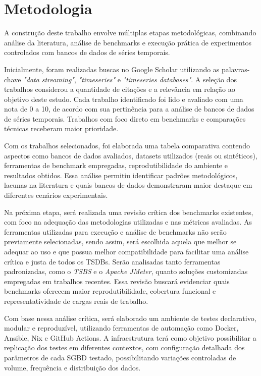 \chapter{Metodologia}

A construção deste trabalho envolve múltiplas etapas metodológicas, combinando análise da literatura, análise de benchmarks e execução prática de experimentos controlados com bancos de dados de séries temporais.

Inicialmente, foram realizadas buscas no Google Scholar utilizando as palavras-chave \textit{"data streaming"}, \textit{"timeseries"} e \textit{"timeseries databases"}. A seleção dos trabalhos considerou a quantidade de citações e a relevância em relação ao objetivo deste estudo. Cada trabalho identificado foi lido e avaliado com uma nota de 0 a 10, de acordo com sua pertinência para a análise de bancos de dados de séries temporais. Trabalhos com foco direto em benchmarks e comparações técnicas receberam maior prioridade.

Com os trabalhos selecionados, foi elaborada uma tabela comparativa contendo aspectos como bancos de dados avaliados, datasets utilizados (reais ou sintéticos), ferramentas de benchmark empregadas, reprodutibilidade do ambiente e resultados obtidos. Essa análise permitiu identificar padrões metodológicos, lacunas na literatura e quais bancos de dados demonstraram maior destaque em diferentes cenários experimentais.

Na próxima etapa, será realizada uma revisão crítica dos benchmarks existentes, com foco na adequação das metodologias utilizadas e nas métricas avaliadas. As ferramentas utilizadas para execução e análise de benchmarks não serão previamente selecionadas, sendo assim, será escolhida aquela que melhor se adequar ao uso e que possua melhor compatibilidade para facilitar uma análise crítica e justa de todos os TSDBs. Serão analisadas tanto ferramentas padronizadas, como o \textit{TSBS} e o \textit{Apache JMeter}, quanto soluções customizadas empregadas em trabalhos recentes. Essa revisão buscará evidenciar quais benchmarks oferecem maior reprodutibilidade, cobertura funcional e representatividade de cargas reais de trabalho.

Com base nessa análise crítica, será elaborado um ambiente de testes declarativo, modular e reproduzível, utilizando ferramentas de automação como Docker, Ansible, Nix e GitHub Actions. A infraestrutura terá como objetivo possibilitar a replicação dos testes em diferentes contextos, com configuração detalhada dos parâmetros de cada SGBD testado, possibilitando variações controladas de volume, frequência e distribuição dos dados.

